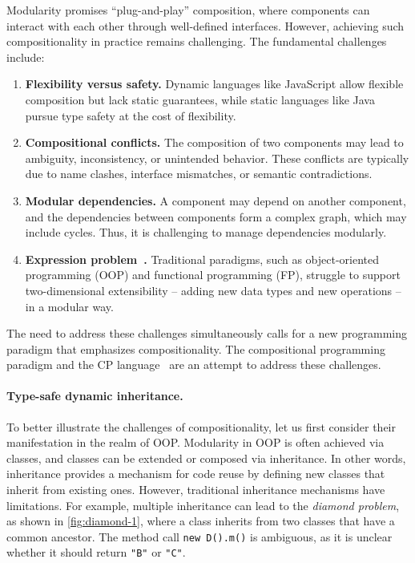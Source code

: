 Modularity promises ``plug-and-play'' composition, where components can interact
with each other through well-defined interfaces. However, achieving such
compositionality in practice remains challenging. The fundamental challenges
include:

\begin{enumerate}
\item \textbf{Flexibility versus safety.} Dynamic languages like JavaScript
      allow flexible composition but lack static guarantees, while static
      languages like Java pursue type safety at the cost of flexibility.
\item \textbf{Compositional conflicts.} The composition of two components may
      lead to ambiguity, inconsistency, or unintended behavior. These conflicts
      are typically due to name clashes, interface mismatches, or semantic
      contradictions.
\item \textbf{Modular dependencies.} A component may depend on another
      component, and the dependencies between components form a complex graph,
      which may include cycles. Thus, it is challenging to manage dependencies
      modularly.
\item \textbf{Expression problem~\textnormal{\citep{wadler1998expression}}.}
      Traditional paradigms, such as object-oriented programming (OOP) and
      functional programming (FP), struggle to support two-dimensional extensibility
      -- adding new data types and new operations -- in a modular way.
\end{enumerate}
The need to address these challenges simultaneously calls for a new programming
paradigm that emphasizes compositionality. The compositional programming
paradigm and the CP language~\citep{zhang2021compositional} are an attempt to
address these challenges.

\paragraph{Type-safe dynamic inheritance.}
To better illustrate the challenges of compositionality, let us first consider
their manifestation in the realm of OOP. Modularity in OOP is often achieved via
classes, and classes can be extended or composed via inheritance. In other
words, inheritance provides a mechanism for code reuse by defining new classes
that inherit from existing ones. However, traditional inheritance mechanisms
have limitations. For example, multiple inheritance can lead to the
\emph{diamond problem}, as shown in \autoref{fig:diamond-1}, where a class
inherits from two classes that have a common ancestor. The method call
\lstinline{new D().m()} is ambiguous, as it is unclear whether it should return
\lstinline{"B"} or \lstinline{"C"}.

